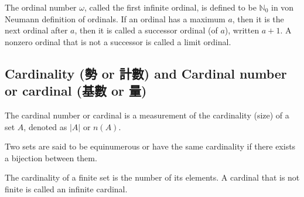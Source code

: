 \documentclass[a4paper,12pt]{article}
\begin{document}
The ordinal number $\omega$, called the first infinite ordinal, is defined to be $\mathbb{N}_0$ in von Neumann definition of ordinals.
If an ordinal has a maximum $a$, then it is the next ordinal after $a$, then it is called a successor ordinal (of $a$), written $a+1$.
A nonzero ordinal that is not a successor is called a limit ordinal.
\subsection{Cardinality (勢 or 計數) and Cardinal number or cardinal (基數 or 量)}
The cardinal number or cardinal is a measurement of the cardinality (size) of a set $A$, denoted as $|A|$ or $n(A)$.

Two sets are said to be equinumerous or have the same cardinality if there exists a bijection between them.

The cardinality of a finite set is the number of its elements. A cardinal that is not finite is called an infinite cardinal.
\end{document}
